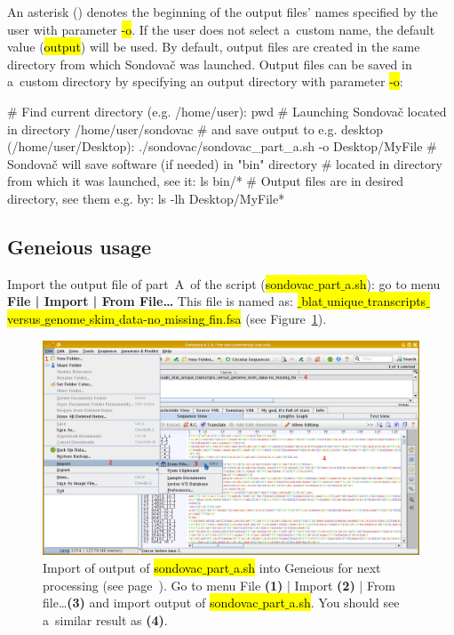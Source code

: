 \documentclass[a4paper, 11pt, twoside]{article}
\renewcommand{\texttt}[1]{\hl{\ttfamily #1}}
\begin{document}
An asterisk (\texttt{*}) denotes the beginning of the output files' names specified by the user with parameter \texttt{-o}. If the user does not select a~custom name, the default value (\texttt{output}) will be used. By default, output files are created in the same directory from which Sondovač was launched. Output files can be saved in a~custom directory by specifying an output directory with parameter \texttt{-o}:

\begin{bashcode}
  # Find current directory (e.g. /home/user):
  pwd
  # Launching Sondovač located in directory /home/user/sondovac
  # and save output to e.g. desktop (/home/user/Desktop):
  ./sondovac/sondovac_part_a.sh -o Desktop/MyFile
  # Sondovač will save software (if needed) in "bin" directory
  # located in directory from which it was launched, see it:
  ls bin/*
  # Output files are in desired directory, see them e.g. by:
  ls -lh Desktop/MyFile*
\end{bashcode}

\subsection{Geneious usage}
\label{geneious-usage}

Import the output file of part~A~of the script (\texttt{sondovac$\_$part$\_$a.sh}): go to menu \textbf{File | Import | From File\ldots} This file is named as: \texttt{*$\_$blat$\_$unique$\_$transcripts$\_$versus$\_$genome$\_$skim$\_$data\--no$\_$missing$\_$fin.fsa} (see Figure~\ref{geneious-import}).

\begin{figure}[hbt]
  \includegraphics[width=\textwidth]{geneious1.png}
  \caption[Import into Geneious]{Import of output of \texttt{sondovac$\_$part$\_$a.sh} into Geneious for next processing (see page~\pageref{pipeline-overview}). Go to menu File \textbf{(1)} | Import \textbf{(2)} | From file\ldots \textbf{(3)} and import output of \texttt{sondovac$\_$part$\_$a.sh}. You should see a~similar result as \textbf{(4)}.}
  \label{geneious-import}
\end{figure}
\end{document}
